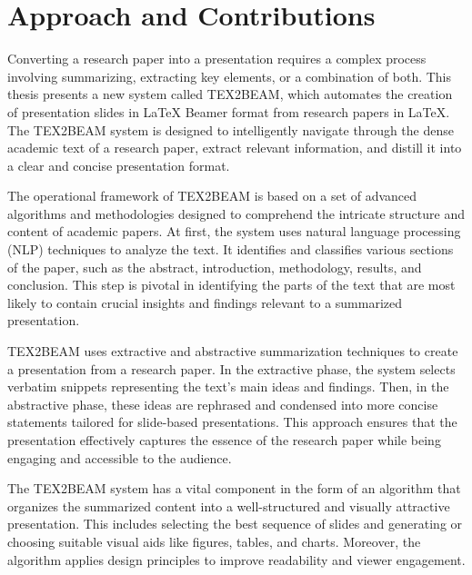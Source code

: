 \section{Approach and Contributions}
\label{sec:intro:approach}


Converting a research paper into a presentation requires a complex process involving summarizing, extracting key elements, or a combination of both. This thesis presents a new system called TEX2BEAM, which automates the creation of presentation slides in \LaTeX{} Beamer format from research papers in \LaTeX{}. The TEX2BEAM system is designed to intelligently navigate through the dense academic text of a research paper, extract relevant information, and distill it into a clear and concise presentation format.

The operational framework of TEX2BEAM is based on a set of advanced algorithms and methodologies designed to comprehend the intricate structure and content of academic papers. At first, the system uses natural language processing (NLP) techniques to analyze the text. It identifies and classifies various sections of the paper, such as the abstract, introduction, methodology, results, and conclusion. This step is pivotal in identifying the parts of the text that are most likely to contain crucial insights and findings relevant to a summarized presentation.

TEX2BEAM uses extractive and abstractive summarization techniques to create a presentation from a research paper. In the extractive phase, the system selects verbatim snippets representing the text's main ideas and findings. Then, in the abstractive phase, these ideas are rephrased and condensed into more concise statements tailored for slide-based presentations. This approach ensures that the presentation effectively captures the essence of the research paper while being engaging and accessible to the audience.

The TEX2BEAM system has a vital component in the form of an algorithm that organizes the summarized content into a well-structured and visually attractive presentation. This includes selecting the best sequence of slides and generating or choosing suitable visual aids like figures, tables, and charts. Moreover, the algorithm applies design principles to improve readability and viewer engagement.

